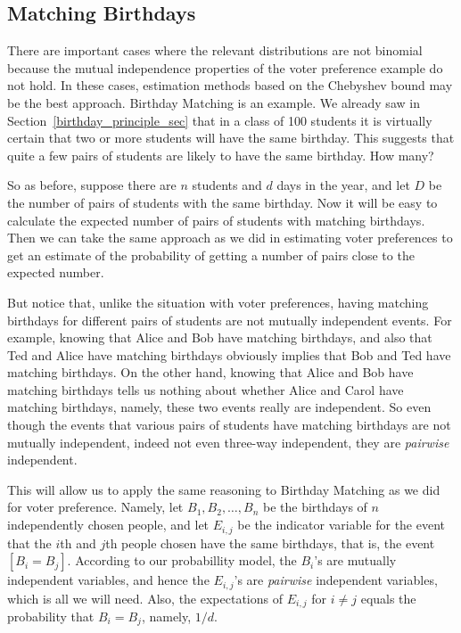 \subsection{Matching Birthdays}

There are important cases where the relevant distributions are not
binomial because the mutual independence properties of the voter
preference example do not hold.  In these cases, estimation methods based
on the Chebyshev bound may be the best approach.  Birthday Matching is an
example.  We already saw in Section~\ref{birthday_principle_sec} that in a
class of 100 students it is virtually certain that two or more students
will have the same birthday.  This suggests that quite a few pairs of
students are likely to have the same birthday.  How many?

So as before, suppose there are $n$ students and $d$ days in the year, and
let $D$ be the number of pairs of students with the same birthday.  Now it
will be easy to calculate the expected number of pairs of students with
matching birthdays.  Then we can take the same approach as we did in
estimating voter preferences to get an estimate of the probability of
getting a number of pairs close to the expected number.

But notice that, unlike the situation with voter preferences, having
matching birthdays for different pairs of students are not mutually
independent events.  For example, knowing that Alice and Bob have matching
birthdays, and also that Ted and Alice have matching birthdays obviously
implies that Bob and Ted have matching birthdays.  On the other hand,
knowing that Alice and Bob have matching birthdays tells us nothing about
whether Alice and Carol have matching birthdays, namely, these two events
really are independent.  So even though the events that various pairs of
students have matching birthdays are not mutually independent, indeed not
even three-way independent, they are \emph{pairwise} independent.


This will allow us to apply the same reasoning to Birthday Matching as we
did for voter preference.  Namely, let $B_1,B_2,\dots,B_n$ be the birthdays
of $n$ independently chosen people, and let $E_{i,j}$ be the indicator
variable for the event that the $i$th and $j$th people chosen have the same
birthdays, that is, the event $[B_i = B_j]$.  According to our probabillity
model, the $B_i$'s are mutually independent variables, and hence the
$E_{i,j}$'s are \emph{pairwise} independent variables, which is all we will
need.  Also, the expectations of $E_{i,j}$ for $i \neq j$ equals the
probability that $B_i = B_j$, namely, $1/d$.

